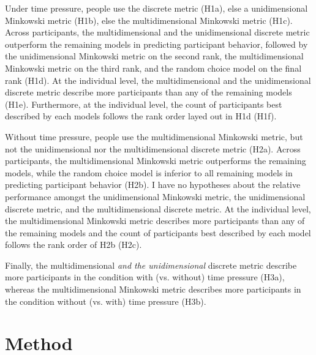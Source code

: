 \documentclass[a4paper,man,natbib]{apa6}
\begin{document}
Under time pressure, people use the discrete metric (H1a), else a unidimensional Minkowski metric (H1b), else the multidimensional Minkowski metric (H1c). Across participants, the multidimensional and the unidimensional discrete metric outperform the remaining models in predicting participant behavior, followed by the unidimensional Minkowski metric on the second rank, the multidimensional Minkowski metric on the third rank, and the random choice model on the final rank (H1d). At the individual level, the multidimensional and the unidimensional discrete metric describe more participants than any of the remaining models (H1e). Furthermore, at the individual level, the count of participants best described by each models follows the rank order layed out in H1d (H1f). 

Without time pressure, people use the multidimensional Minkowski metric, but not the unidimensional nor the multidimensional discrete metric (H2a). Across participants, the multidimensional Minkowski metric outperforms the remaining models, while the random choice model is inferior to all remaining models in predicting participant behavior (H2b). I have no hypotheses about the relative performance amongst the unidimensional Minkowski metric, the unidimensional discrete metric, and the multidimensional discrete metric. At the individual level, the multidimensional Minkowski metric describes more participants than any of the remaining models and the count of participants best described by each model follows the rank order of H2b (H2c). 

Finally, the multidimensional \textit{and the unidimensional} discrete metric describe more participants in the condition with (vs. without) time pressure (H3a), whereas the multidimensional Minkowski metric describes more participants in the condition without (vs. with) time pressure (H3b).

\section{Method}
\end{document}
